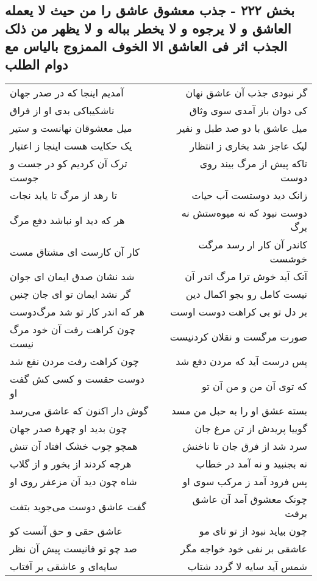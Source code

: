 \begin{center}
\section*{بخش ۲۲۲ - جذب معشوق عاشق را من حیث لا یعمله العاشق و لا یرجوه و لا یخطر بباله و لا یظهر من ذلک الجذب اثر فی العاشق الا الخوف الممزوج بالیاس مع دوام الطلب}
\label{sec:sh222}
\begin{longtable}{l p{0.5cm} r}
آمدیم اینجا که در صدر جهان
&&
گر نبودی جذب آن عاشق نهان
\\
ناشکیباکی بدی او از فراق
&&
کی دوان باز آمدی سوی وثاق
\\
میل معشوقان نهانست و ستیر
&&
میل عاشق با دو صد طبل و نفیر
\\
یک حکایت هست اینجا ز اعتبار
&&
لیک عاجز شد بخاری ز انتظار
\\
ترک آن کردیم کو در جست و جوست
&&
تاکه پیش از مرگ بیند روی دوست
\\
تا رهد از مرگ تا یابد نجات
&&
زانک دید دوستست آب حیات
\\
هر که دید او نباشد دفع مرگ
&&
دوست نبود که نه میوه‌ستش نه برگ
\\
کار آن کارست ای مشتاق مست
&&
کاندر آن کار ار رسد مرگت خوشست
\\
شد نشان صدق ایمان ای جوان
&&
آنک آید خوش ترا مرگ اندر آن
\\
گر نشد ایمان تو ای جان چنین
&&
نیست کامل رو بجو اکمال دین
\\
هر که اندر کار تو شد مرگ‌دوست
&&
بر دل تو بی کراهت دوست اوست
\\
چون کراهت رفت آن خود مرگ نیست
&&
صورت مرگست و نقلان کردنیست
\\
چون کراهت رفت مردن نفع شد
&&
پس درست آید که مردن دفع شد
\\
دوست حقست و کسی کش گفت او
&&
که توی آن من و من آن تو
\\
گوش دار اکنون که عاشق می‌رسد
&&
بسته عشق او را به حبل من مسد
\\
چون بدید او چهرهٔ صدر جهان
&&
گوییا پریدش از تن مرغ جان
\\
همچو چوب خشک افتاد آن تنش
&&
سرد شد از فرق جان تا ناخنش
\\
هرچه کردند از بخور و از گلاب
&&
نه بجنبید و نه آمد در خطاب
\\
شاه چون دید آن مزعفر روی او
&&
پس فرود آمد ز مرکب سوی او
\\
گفت عاشق دوست می‌جوید بتفت
&&
چونک معشوق آمد آن عاشق برفت
\\
عاشق حقی و حق آنست کو
&&
چون بیاید نبود از تو تای مو
\\
صد چو تو فانیست پیش آن نظر
&&
عاشقی بر نفی خود خواجه مگر
\\
سایه‌ای و عاشقی بر آفتاب
&&
شمس آید سایه لا گردد شتاب
\\
\end{longtable}
\end{center}
